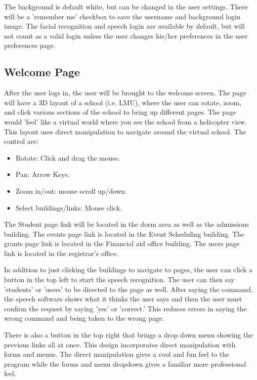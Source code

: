 \documentclass{article}
\begin{document}
The background is default white, but can be changed in the user settings.  There will be a 'remember me' checkbox to save the username and background login image.  The facial recognition and speech login are available by default, but will not count as a valid login unless the user changes his/her preferences in the user preferences page.

\subsection{Welcome Page}

After the user logs in, the user will be brought to the welcome screen.  The page will have a 3D layout of a school (i.e. LMU), where the user can rotate, zoom, and click various sections of the school to bring up different pages.  The page would 'feel' like a virtual world where you see the school from a helicopter view. This layout uses direct manipulation to navigate around the virtual school.  The control are:

\begin{itemize}
\item Rotate: Click and drag the mouse.
\item Pan: Arrow Keys.
\item Zoom in/out: mouse scroll up/down.
\item Select buildings/links: Mouse click. 
\end{itemize}

The Student page link will be located in the dorm area as well as the admissions building.  The events page link is located in the Event Scheduling building.  The grants page link is located in the Financial aid office building.  The users page link is located in the registrar's office. 

In addition to just clicking the buildings to navigate to pages, the user can click a button in the top left to start the speech recognition.  The user can then say 'students' or 'users' to be directed to the page as well.  After saying the command, the speech software shows what it thinks the user says and then the user must confirm the request by saying 'yes' or 'correct.'  This reduces errors in saying the wrong command and being taken to the wrong page.

There is also a button in the top right that brings a drop down menu showing the previous links all at once.  This design incorporates direct manipulation with forms and menus.  The direct manipulation gives a cool and fun feel to the program while the forms and menu dropdown gives a familiar more professional feel.



\end{document}
